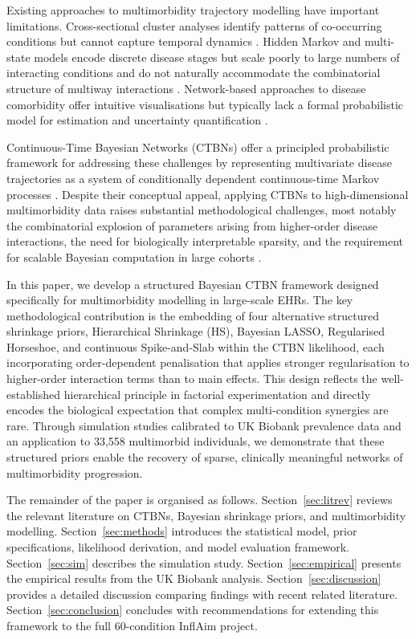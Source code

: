 \documentclass[12pt]{article}
\begin{document}
Existing approaches to multimorbidity trajectory modelling have important
limitations.  Cross-sectional cluster analyses identify patterns of co-occurring
conditions but cannot capture temporal dynamics \citep{nicholson2019multimorbidity}.
Hidden Markov and multi-state models encode discrete disease stages but scale
poorly to large numbers of interacting conditions and do not naturally
accommodate the combinatorial structure of multiway interactions
\citep{Putter2007}.  Network-based approaches to disease comorbidity offer
intuitive visualisations but typically lack a formal probabilistic model for
estimation and uncertainty quantification \citep{valabhji2024prevalence}.

Continuous-Time Bayesian Networks (CTBNs) offer a principled probabilistic
framework for addressing these challenges by representing multivariate disease
trajectories as a system of conditionally dependent continuous-time Markov
processes \citep{nodelman2007continuous}.  Despite their conceptual appeal,
applying CTBNs to high-dimensional multimorbidity data raises substantial
methodological challenges, most notably the combinatorial explosion of parameters
arising from higher-order disease interactions, the need for biologically
interpretable sparsity, and the requirement for scalable Bayesian computation
in large cohorts \citep{faruqui2021functional}.

In this paper, we develop a structured Bayesian CTBN framework designed
specifically for multimorbidity modelling in large-scale EHRs.  The key
methodological contribution is the embedding of four alternative structured
shrinkage priors, Hierarchical Shrinkage (HS), Bayesian LASSO, Regularised
Horseshoe, and continuous Spike-and-Slab within the CTBN likelihood, each
incorporating order-dependent penalisation that applies stronger regularisation
to higher-order interaction terms than to main effects.  This design reflects
the well-established hierarchical principle in factorial experimentation
\citep{HamadaWu1992} and directly encodes the biological expectation that
complex multi-condition synergies are rare.  Through simulation studies
calibrated to UK Biobank prevalence data and an application to 33,558
multimorbid individuals, we demonstrate that these structured priors enable
the recovery of sparse, clinically meaningful networks of multimorbidity
progression.

The remainder of the paper is organised as follows.  Section~\ref{sec:litrev}
reviews the relevant literature on CTBNs, Bayesian shrinkage priors, and
multimorbidity modelling.  Section~\ref{sec:methods} introduces the statistical
model, prior specifications, likelihood derivation, and model evaluation
framework.  Section~\ref{sec:sim} describes the simulation study.
Section~\ref{sec:empirical} presents the empirical results from the UK Biobank
analysis.  Section~\ref{sec:discussion} provides a detailed discussion
comparing findings with recent related literature.  Section~\ref{sec:conclusion}
concludes with recommendations for extending this framework to the full
60-condition InflAim project.
\end{document}

